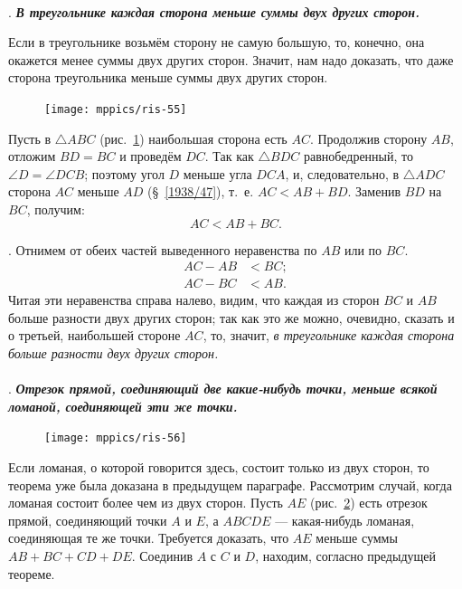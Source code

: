 \documentclass[oneside]{book}
\begin{document}
\paragraph{}\label{1938/50}
.
\textbf{\emph{В треугольнике каждая сторона меньше суммы двух других сторон.}}

Если в треугольнике возьмём сторону не самую большую, то, конечно, она окажется менее суммы двух других сторон.
Значит, нам надо доказать, что даже  сторона треугольника меньше суммы двух других сторон.

\begin{figure}
\centering
\texttt{[image: mppics/ris-55]}
\caption{}\label{1938/ris-55}
\end{figure}

Пусть в $\triangle ABC$ (рис.~\ref{1938/ris-55}) наибольшая сторона есть $AC$.
Продолжив сторону $AB$, отложим $BD=BC$ и проведём $DC$.
Так как $\triangle BDC$ равнобедренный, то $\angle D = \angle DCB$;
поэтому угол $D$ меньше угла $DCA$, и, следовательно, в $\triangle ADC$ сторона $AC$ меньше $AD$ (§~\ref{1938/47}), т.~е.
$AC < AB + BD$.
Заменив $BD$ на $BC$, получим:
\[AC < AB + BC.\]

.
Отнимем от обеих частей выведенного неравенства по $AB$ или по $BC$.
\begin{align*}
AC-AB&<BC;
\\
AC-BC&<AB.
\end{align*}
Читая эти неравенства справа налево, видим, что каждая из сторон $BC$ и $AB$ больше разности двух других сторон;
так как это же можно, очевидно, сказать и о третьей, наибольшей стороне $AC$, то, значит, \emph{в треугольнике каждая сторона больше разности двух других сторон.}


\paragraph{}\label{1938/51}
.
\textbf{\emph{Отрезок прямой, соединяющий две какие-нибудь точки, меньше всякой ломаной, соединяющей эти же точки.}}

\begin{figure}
\centering
\texttt{[image: mppics/ris-56]}
\caption{}\label{1938/ris-56}
\end{figure}

Если ломаная, о которой говорится здесь, состоит только из двух сторон, то теорема уже была доказана в предыдущем параграфе.
Рассмотрим случай, когда ломаная состоит более чем из двух сторон.
Пусть $AE$ (рис.~\ref{1938/ris-56}) есть отрезок прямой, соединяющий точки $A$ и $E$, а $ABCDE$ — какая-нибудь ломаная, соединяющая те же точки.
Требуется доказать, что $AE$ меньше суммы $AB+BC+CD+DE$.
Соединив $A$ с $C$ и $D$, находим, согласно предыдущей теореме.
\end{document}
